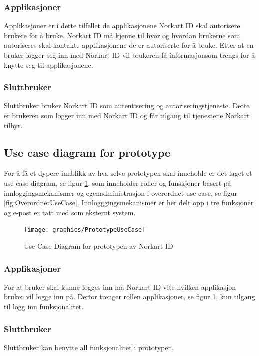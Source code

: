 \subsubsection* {Applikasjoner}
Applikasjoner er i dette tilfellet de applikasjonene Norkart ID skal autorisere brukere for å bruke. Norkart ID må kjenne til hvor og hvordan brukerne som autoriseres skal kontakte applikasjonene de er autoriserte for å bruke. Etter at en bruker logger seg inn med Norkart ID vil brukeren få informasjonsom trengs for å knytte seg til applikasjonene.

\subsubsection* {Sluttbruker}
Sluttbruker bruker Norkart ID som autentisering og autoriseringstjeneste. Dette er brukeren som logger inn med Norkart ID og får tilgang til tjenestene Norkart tilbyr.

\subsection {Use case diagram for prototype}
\label{subsec:prototype_use_case}
For å få et dypere innblikk av hva selve prototypen skal inneholde er det laget et use case diagram, se figur \ref{fig:PrototypeUseCase}, som inneholder roller og funskjoner basert på innloggingsmekanismer og egenadministrasjon i overordnet use case, se figur \ref{fig:OverordnetUseCase}. Innlogggingsmekanismer er her delt opp i tre funksjoner og e-post er tatt med som eksternt system. 

\begin{figure}[h]
    \texttt{[image: graphics/PrototypeUseCase]}
    \caption{Use Case Diagram for prototypen av Norkart ID }
    \label{fig:PrototypeUseCase}
\end{figure}

\subsubsection* {Applikasjoner}
For at bruker skal kunne logges inn må Norkart ID vite hvilken applikasjon bruker vil logge inn på. Derfor trenger rollen applikasjoner, se figur  \ref{fig:PrototypeUseCase}, kun tilgang til logg inn funksjonalitet.

\subsubsection* {Sluttbruker}
Sluttbruker kan benytte all funksjonalitet i prototypen.

